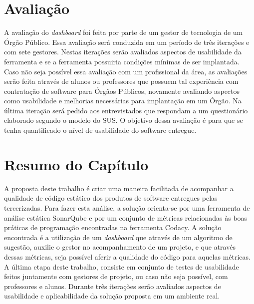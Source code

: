 \section{Avaliação}

A avaliação do \textit{dashboard} foi feita por parte de um gestor de tecnologia de um Órgão Público. Essa avaliação será conduzida em um período de três iterações e com sete gestores. Nestas iterações serão avaliados aspectos de usabilidade da ferramenta e se a ferramenta possuiria condições mínimas de ser implantada. Caso não seja possível essa avaliação com um profissional da área, as avaliações serão feita através de alunos ou professores que possuem tal experiência com contratação de software para Órgãos Públicos, novamente avaliando aspectos como usabilidade e melhorias necessárias para implantação em um Órgão. Na última iteração será pedido aos entrevistados que respondam a um questionário elaborado segundo o modelo do SUS. O objetivo dessa avaliação é para que se tenha quantificado o nível de usabilidade do software entregue.


\section{Resumo do Capítulo}

A proposta deste trabalho é criar uma maneira facilitada de acompanhar a qualidade de código estático dos produtos de software entregues pelas tercerizadas. Para fazer esta análise, a solução orienta-se por uma ferramenta de análise estática SonarQube e por um conjunto de métricas relacionadas às boas práticas de programação encontradas na ferramenta Codacy. A solução encontrada é a utilização de um \textit{dashboard} que através de um algoritmo de sugestão, auxilie o gestor no acompanhamento de um projeto, e que através dessas métricas, seja possível aferir a qualidade do código para aquelas métricas. A última etapa deste trabalho, consiste em conjunto de testes de usabilidade feitos juntamente com gestores de projeto, ou caso não seja possível, com professores e alunos. Durante três iterações serão avaliados aspectos de usabilidade e aplicabilidade da solução proposta em um ambiente real.